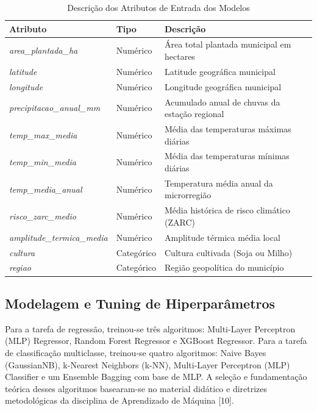 \documentclass[conference]{IEEEtran}
\begin{document}
\begin{table}[h]
\centering
\caption{Descrição dos Atributos de Entrada dos Modelos}
\label{tab:atributos}
\footnotesize
\begin{tabular}{lll}
\toprule
\textbf{Atributo} & \textbf{Tipo} & \textbf{Descrição} \\
\midrule
\textit{area\_plantada\_ha} & Numérico & Área total plantada municipal em hectares \\
\textit{latitude} & Numérico & Latitude geográfica municipal \\
\textit{longitude} & Numérico & Longitude geográfica municipal \\
\textit{precipitacao\_anual\_mm} & Numérico & Acumulado anual de chuvas da estação regional \\
\textit{temp\_max\_media} & Numérico & Média das temperaturas máximas diárias \\
\textit{temp\_min\_media} & Numérico & Média das temperaturas mínimas diárias \\
\textit{temp\_media\_anual} & Numérico & Temperatura média anual da microrregião \\
\textit{risco\_zarc\_medio} & Numérico & Média histórica de risco climático (ZARC) \\
\textit{amplitude\_termica\_media} & Numérico & Amplitude térmica média local \\
\textit{cultura} & Categórico & Cultura cultivada (Soja ou Milho) \\
\textit{regiao} & Categórico & Região geopolítica do município \\
\bottomrule
\end{tabular}
\end{table}

\subsection{Modelagem e Tuning de Hiperparâmetros}
Para a tarefa de regressão, treinou-se três algoritmos: Multi-Layer Perceptron (MLP) Regressor, Random Forest Regressor e XGBoost Regressor.
Para a tarefa de classificação multiclasse, treinou-se quatro algoritmos: Naive Bayes (GaussianNB), k-Nearest Neighbors (k-NN), Multi-Layer Perceptron (MLP) Classifier e um Ensemble Bagging com base de MLP. A seleção e fundamentação teórica desses algoritmos basearam-se no material didático e diretrizes metodológicas da disciplina de Aprendizado de Máquina [10].
\end{document}
